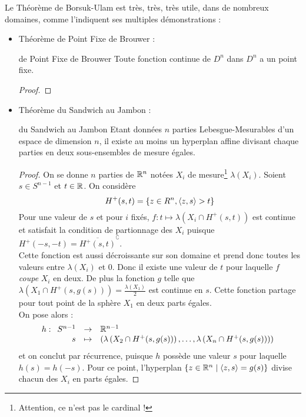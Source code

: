 \documentclass{cours}
\begin{document}
Le Théorème de Borsuk-Ulam est très, très, très utile, dans de nombreux domaines, comme l'indiquent ses multiples démonstrations :
\begin{itemize}
    \item Théorème de Point Fixe de Brouwer : 
    \begin{théorème}{de Point Fixe de Brouwer}{}
        Toute fonction continue de $D^{n}$ dans $D^{n}$ a un point fixe.
    \end{théorème}
    \begin{proof}
        
    \end{proof}
    \item Théorème du Sandwich au Jambon : 
    \begin{théorème}{du Sandwich au Jambon}{}
        Etant données $n$ parties Lebesgue-Mesurables d'un espace de dimension $n$, il existe au moins un hyperplan affine divisant chaque parties en deux sous-ensembles de mesure égales.
    \end{théorème}
    \begin{proof}
        On se donne $n$ parties de $\mathbb{R}^{n}$ notées $X_{i}$ de mesure\footnote{Attention, ce n'est pas le cardinal !} $\lambda\left(X_{i}\right)$. Soient $s \in S^{n - 1}$ et $t\in \mathbb{R}$. On considère
        \[
            H^{+}(s, t) = \left\{z \in R^{n}, \left\langle z, s \right\rangle > t\right\}
        \]
        Pour une valeur de $s$ et pour $i$ fixés, $f : t \mapsto \lambda\left(X_{i} \cap H^{+}(s, t)\right)$ est continue et satisfait la condition de partionnage des $X_{i}$ puisque $H^{+}(-s, -t) = \overline{H^{+}(s, t)}^{\complement}$.\\
        Cette fonction est aussi décroissante sur son domaine et prend donc toutes les valeurs entre $\lambda\left(X_{i}\right)$ et $0$. Donc il existe une valeur de $t$ pour laquelle $f$ \textit{coupe} $X_{i}$ en deux. De plus la fonction $g$ telle que $\lambda\left(X_{1}\cap H^{+}(s, g(s))\right) = \frac{\lambda\left(X_{1}\right)}{2}$ est continue en $s$. Cette fonction partage pour tout point de la sphère $X_{1}$ en deux parts égales. \\
        On pose alors : 
        \[
            h : \begin{array}[t]{rcl} S^{n - 1} & \to & \mathbb{R}^{n - 1} \\ s & \mapsto & \left(\lambda\left(X_{2} \cap H^{+}(s, g(s))\right), \ldots, \lambda\left(X_{n} \cap H^{+}(s, g(s))\right)\right) \end{array}
        \]
        et on conclut par récurrence, puisque $h$ possède une valeur $s$ pour laquelle $h(s) = h(-s)$. Pour ce point, l'hyperplan $\left\{z \in \mathbb{R}^{n} \mid \left\langle z, s \right\rangle = g(s)\right\}$ divise chacun des $X_{i}$ en parts égales. 

\end{proof}
\end{itemize}
\end{document}
